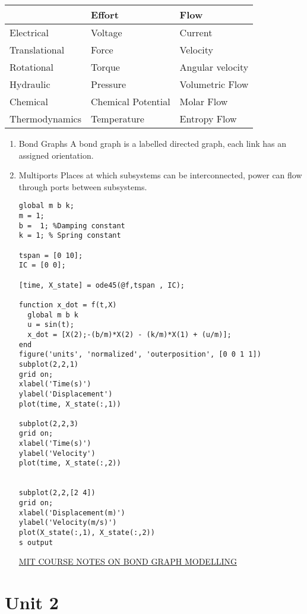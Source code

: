 \documentclass[11pt]{report}
\begin{document}
\begin{center}
\begin{tabular}{lll}
\hline
 & Effort & Flow\\
\hline
Electrical & Voltage & Current\\
Translational & Force & Velocity\\
Rotational & Torque & Angular velocity\\
Hydraulic & Pressure & Volumetric Flow\\
Chemical & Chemical Potential & Molar Flow\\
Thermodynamics & Temperature & Entropy Flow\\
\hline
\end{tabular}
\end{center}
\begin{enumerate}
\item Bond Graphs
\label{sec:orgdfca559}
A bond graph is a labelled directed graph, each link has an assigned orientation.
\item Multiports
\label{sec:org38e5ec5}
Places at which subsystems can be interconnected, power can flow through ports between subsystems.

\begin{verbatim}
global m b k;
m = 1;
b =  1; %Damping constant
k = 1; % Spring constant

tspan = [0 10];
IC = [0 0];

[time, X_state] = ode45(@f,tspan , IC);

function x_dot = f(t,X)
  global m b k
  u = sin(t);
  x_dot = [X(2);-(b/m)*X(2) - (k/m)*X(1) + (u/m)];
end
figure('units', 'normalized', 'outerposition', [0 0 1 1])
subplot(2,2,1)
grid on;
xlabel('Time(s)')
ylabel('Displacement')
plot(time, X_state(:,1))

subplot(2,2,3)
grid on;
xlabel('Time(s)')
ylabel('Velocity')
plot(time, X_state(:,2))


subplot(2,2,[2 4])
grid on;
xlabel('Displacement(m)')
ylabel('Velocity(m/s)')
plot(X_state(:,1), X_state(:,2))
s output
\end{verbatim}

\href{https://ocw.mit.edu/courses/2-141-modeling-and-simulation-of-dynamic-systems-fall-2006/71ca8916669d0aa6839ce780db9f5288\_bond\_graph\_intro.pdf}{MIT COURSE NOTES ON BOND GRAPH MODELLING}
\end{enumerate}
\chapter{Unit 2}
\label{sec:org3b77352}
\end{document}
